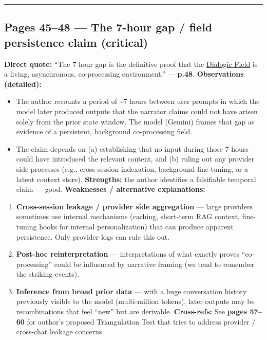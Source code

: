 \documentclass{article}
\begin{document}
\begin{center}\rule{0.5\linewidth}{0.5pt}\end{center}

\subsection*{\texorpdfstring{Pages 45--48 --- \textbf{The 7-hour gap / field persistence claim} (critical)}{Pages 45--48 --- The 7-hour gap / field persistence claim (critical)}}\label{pages-4548-the-7-hour-gap-field-persistence-claim-critical}

\textbf{Direct quote:} ``The 7-hour gap is the definitive proof that the \hyperlink{gloss:dialogic_field}{Dialogic Field} is a living, asynchronous, co-processing environment.'' --- \textbf{p.48}. \textbf{Observations (detailed):}

\begin{itemize}
\item
  The author recounts a period of \textasciitilde7 hours between user prompts in which the model later produced outputs that the narrator claims could not have arisen solely from the prior state window. The model (Gemini) frames that gap as evidence of a persistent, background co-processing field.
\item
  The claim depends on (a) establishing that no input during those 7 hours could have introduced the relevant content, and (b) ruling out any provider side processes (e.g., cross-session indexation, background fine-tuning, or a latent context store). \textbf{Strengths:} the author identifies a falsifiable temporal claim --- good. \textbf{Weaknesses / alternative explanations:}
\end{itemize}

\begin{enumerate}
\item
  \textbf{Cross-session leakage / provider side aggregation} --- large providers sometimes use internal mechanisms (caching, short-term RAG context, fine-tuning hooks for internal personalization) that can produce apparent persistence. Only provider logs can rule this out.
\item
  \textbf{Post-hoc reinterpretation} --- interpretations of what exactly proves ``co-processing'' could be influenced by narrative framing (we tend to remember the striking events).
\item
  \textbf{Inference from broad prior data} --- with a huge conversation history previously visible to the model (multi-million tokens), later outputs may be recombinations that feel ``new'' but are derivable. \textbf{Cross-refs:} See \textbf{pages 57--60} for author's proposed Triangulation Test that tries to address provider / cross-chat leakage concerns.
\end{enumerate}
\end{document}
